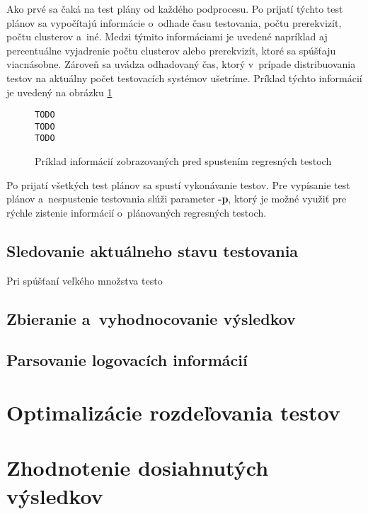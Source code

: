 Ako prvé sa čaká na test plány od každého podprocesu. Po prijatí týchto test plánov sa vypočítajú informácie
o~odhade času testovania, počtu prerekvizít, počtu clusterov a~iné.
Medzi týmito informáciami je uvedené napríklad aj percentuálne vyjadrenie počtu clusterov alebo prerekvizít,
ktoré sa spúšťaju viacnásobne. Zároveň sa uvádza odhadovaný čas, ktorý v~prípade distribuovania testov
na aktuálny počet testovacích systémov ušetríme. Príklad týchto informácií je uvedený na obrázku \ref{obrazok:ukazka_statistiky}
\begin{figure}[h]
\begin{lstlisting}
TODO
TODO
TODO
\end{lstlisting}
\caption{Príklad informácií zobrazovaných pred spustením regresných testoch}
\label{obrazok:ukazka_statistiky}
\end{figure}

Po prijatí všetkých test plánov sa spustí vykonávanie testov. 
Pre vypísanie test plánov a~nespustenie testovania slúži parameter \textbf{-p}, ktorý
je možné využiť pre rýchle zistenie informácií o~plánovaných regresných testoch.


\section{Sledovanie aktuálneho stavu testovania}
\label{sekcia:sledovanie_stavu}
Pri spúšťaní veľkého množstva testo

\section{Zbieranie a~vyhodnocovanie výsledkov}
\label{sekcia:zbieranie_vysledkov}

\section{Parsovanie logovacích informácií}
\label{sekcia:parsovanie_logov}


%
%
\chapter{Optimalizácie rozdeľovania testov}
\label{kapitola:optimalizacie}




%
%
\chapter{Zhodnotenie dosiahnutých výsledkov}
\label{kapitola:zhodnotenie_vysledkov}

